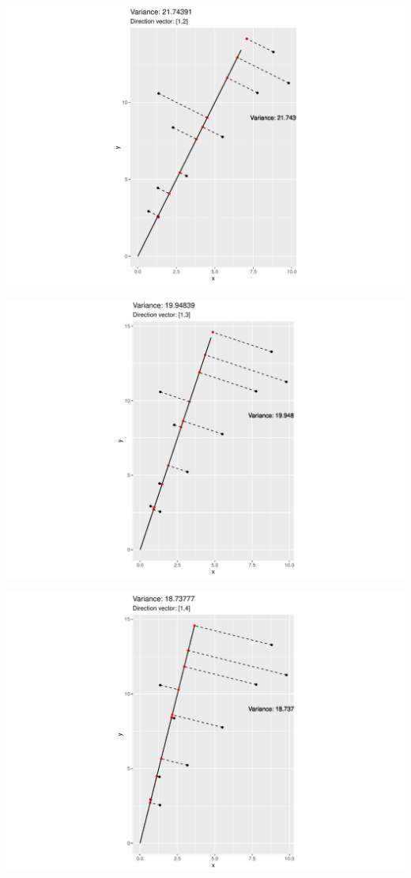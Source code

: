 \documentclass[
  ignorenonframetext,
]{beamer}
\begin{document}
\begin{frame}{}
\protect\hypertarget{section-20}{}
\includegraphics{note9_files/figure-beamer/unnamed-chunk-27-1.pdf}
\end{frame}

\begin{frame}{}
\protect\hypertarget{section-21}{}
\includegraphics{note9_files/figure-beamer/unnamed-chunk-28-1.pdf}
\end{frame}

\begin{frame}{}
\protect\hypertarget{section-22}{}
\includegraphics{note9_files/figure-beamer/unnamed-chunk-29-1.pdf}
\end{frame}
\end{document}
